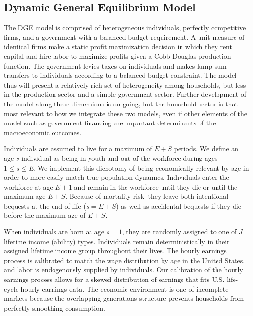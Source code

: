 \documentclass[letterpaper,12pt]{article}
\theoremstyle{definition}
\begin{document}
\begin{spacing}{1.5}
\section{Dynamic General Equilibrium Model}\label{SecDGE}

 The DGE model is comprised of heterogeneous individuals, perfectly competitive firms, and a government with a balanced budget requirement. A unit measure of identical firms make a static profit maximization decision in which they rent capital and hire labor to maximize profits given a Cobb-Douglas production function. The government levies taxes on individuals and makes lump sum transfers to individuals according to a balanced budget constraint.  The model thus will present a relatively rich set of heterogeneity among households, but less in the production sector and a simple government sector.  Further development of the model along these dimensions is on going, but the household sector is that most relevant to how we integrate these two models, even if other elements of the model such as government financing are important determinants of the macroeconomic outcomes.

  Individuals are assumed to live for a maximum of $E+S$ periods. We define an age-$s$ individual as being in youth and out of the workforce during ages $1\leq s\leq E$. We implement this dichotomy of being economically relevant by age in order to more easily match true population dynamics. Individuals enter the workforce at age $E+1$ and remain in the workforce until they die or until the maximum age $E+S$. Because of mortality risk, they leave both intentional bequests at the end of life ($s=E+S$) as well as accidental bequests if they die before the maximum age of $E+S$.

  When individuals are born at age $s=1$, they are randomly assigned to one of $J$ lifetime income (ability) types. Individuals remain deterministically in their assigned lifetime income group throughout their lives. The hourly earnings process is calibrated to match the wage distribution by age in the United States, and labor is endogenously supplied by individuals. Our calibration of the hourly earnings process allows for a skewed distribution of earnings that fits U.S. life-cycle hourly earnings data. The economic environment is one of incomplete markets because the overlapping generations structure prevents households from perfectly smoothing consumption.




\end{spacing}
\end{document}
